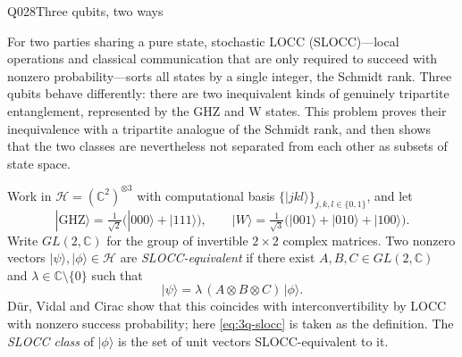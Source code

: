 %
%
\begin{entry}{Q028}{Three qubits, two ways}


\begin{problem}
For two parties sharing a pure state, stochastic LOCC (SLOCC)---local
operations and classical communication that are only required to succeed
with nonzero probability---sorts all states by a single integer, the Schmidt
rank. Three qubits behave differently: there are two inequivalent kinds of
genuinely tripartite entanglement, represented by the GHZ and W states. This
problem proves their inequivalence with a tripartite analogue of the Schmidt
rank, and then shows that the two classes are nevertheless not separated from
each other as subsets of state space.

Work in $\mathcal{H} = (\mathbb{C}^2)^{\otimes 3}$ with computational basis
$\{|jkl\rangle\}_{j,k,l\in\{0,1\}}$, and let
\begin{equation}
  |\mathrm{GHZ}\rangle = \tfrac{1}{\sqrt2}\big(|000\rangle + |111\rangle\big),
  \qquad
  |W\rangle = \tfrac{1}{\sqrt3}\big(|001\rangle + |010\rangle + |100\rangle\big).
  \label{q028: GHZ and W states}
\end{equation}
Write $GL(2,\mathbb{C})$ for the group of invertible $2\times 2$ complex
matrices. Two nonzero vectors $|\psi\rangle, |\phi\rangle \in \mathcal{H}$
are \emph{SLOCC-equivalent} if there exist $A, B, C \in GL(2,\mathbb{C})$ and
$\lambda \in \mathbb{C}\setminus\{0\}$ such that
\begin{equation}\label{eq:3q-slocc}
  |\psi\rangle = \lambda\,(A\otimes B\otimes C)\,|\phi\rangle .
\end{equation}
D\"ur, Vidal and Cirac show that this coincides with interconvertibility by
LOCC with nonzero success probability; here \eqref{eq:3q-slocc} is taken as
the definition. The \emph{SLOCC class} of $|\phi\rangle$ is the set of unit
vectors SLOCC-equivalent to it.


\end{problem}
\end{entry}

